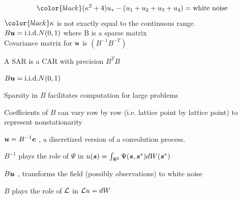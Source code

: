 \documentclass[bgimage]{/Users/nychka/Dropbox/Home/Tex/pfuef/pfuef}
\def\Mycomment#1{{\color{midnightblue}{\it  {\large #1}}}}
\begin{document}
\Mycomment{ The SAR:}   
 {\[ { \color{black}  (\kappa^2 + 4)} u_*   -  
                                     \left( u_1 + u_2 + u_3 + u_4 \right)  
                                      = \mbox{white noise} \]                           
\bdot ${\color{black} \kappa}$  is not exactly equal to the continuous range.    
\\
\bdot  $B \mbox{\boldmath $u$} =  \mbox{i.i.d.} N(0,1) $     where B is a sparse matrix 
\\
\bdot Covariance matrix  for $\mbox{\boldmath $u$}$ is  $ (B^{-1} B^{-T}  )  $  

\bdot A SAR is a CAR with  precision  $B^T B $



{\Large
$B \mbox{\boldmath $u$}  =  \mbox{i.i.d.} N(0,1) $     
}

\bdot Sparsity in $B$ facilitates computation for large problems

\bdot Coefficients of $B$ can vary row by row (i.e. lattice point by lattice point) to represent nonstationarity

\bdot   $ \mbox{\boldmath $u$} = B^{-1} \mbox{\boldmath $e$}    $  , a discretized version of a convolution process. 

$B^{-1}$ plays the role of $\Psi$ in $ u(\mbox{\boldmath $s$}) = \int_{\Re^2} \Psi( \mbox{\boldmath $s$}, \mbox{\boldmath $s$}^*) dW(\mbox{\boldmath $s$}^*)  $ 

\bdot   $  B \mbox{\boldmath $u$}  $  , transforms the field (possibly observations) to white noise 

$B$ plays the role of ${\cal{L}}$ in  ${\cal{L}} u = dW$

 
}
\end{document}
